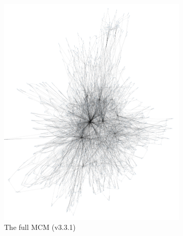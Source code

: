 \begin{figure}[H]
     \centering     
      \begin{subfigure}[b]{0.495\textwidth}
         \centering
         \includegraphics[width=\textwidth]{figures_c1/graph_compare/fullmcm.png}
         \caption{The full MCM (v3.3.1)}
         \label{fig:mcm}
     \end{subfigure}
      \hfill
       \begin{subfigure}[b]{0.495\textwidth}
          \centering

\end{subfigure}
\end{figure}
